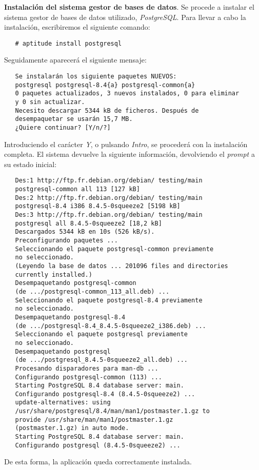 \item \textbf{Instalación del sistema gestor de bases de datos}.
   Se procede a instalar el sistema gestor de bases de datos utilizado,
   \textit{PostgreSQL}. Para llevar a cabo la instalación, escribiremos el
   siguiente comando:

   \begin{verbatim}
   # aptitude install postgresql
   \end{verbatim}

   Seguidamente aparecerá el siguiente mensaje:

   \begin{verbatim}
   Se instalarán los siguiente paquetes NUEVOS:
   postgresql postgresql-8.4{a} postgresql-common{a}
   0 paquetes actualizados, 3 nuevos instalados, 0 para eliminar
   y 0 sin actualizar.
   Necesito descargar 5344 kB de ficheros. Después de
   desempaquetar se usarán 15,7 MB.
   ¿Quiere continuar? [Y/n/?]
   \end{verbatim}

   Introduciendo el carácter \textit{Y}, o pulsando \textit{Intro}, se procederá
   con la instalación completa. El sistema devuelve la siguiente información,
   devolviendo el \textit{prompt} a su estado inicial:

   \begin{verbatim}
   Des:1 http://ftp.fr.debian.org/debian/ testing/main
   postgresql-common all 113 [127 kB]
   Des:2 http://ftp.fr.debian.org/debian/ testing/main
   postgresql-8.4 i386 8.4.5-0squeeze2 [5198 kB]
   Des:3 http://ftp.fr.debian.org/debian/ testing/main
   postgresql all 8.4.5-0squeeze2 [18,2 kB]
   Descargados 5344 kB en 10s (526 kB/s).
   Preconfigurando paquetes ...
   Seleccionando el paquete postgresql-common previamente
   no seleccionado.
   (Leyendo la base de datos ... 201096 files and directories
   currently installed.)
   Desempaquetando postgresql-common
   (de .../postgresql-common_113_all.deb) ...
   Seleccionando el paquete postgresql-8.4 previamente
   no seleccionado.
   Desempaquetando postgresql-8.4
   (de .../postgresql-8.4_8.4.5-0squeeze2_i386.deb) ...
   Seleccionando el paquete postgresql previamente
   no seleccionado.
   Desempaquetando postgresql
   (de .../postgresql_8.4.5-0squeeze2_all.deb) ...
   Procesando disparadores para man-db ...
   Configurando postgresql-common (113) ...
   Starting PostgreSQL 8.4 database server: main.
   Configurando postgresql-8.4 (8.4.5-0squeeze2) ...
   update-alternatives: using
   /usr/share/postgresql/8.4/man/man1/postmaster.1.gz to
   provide /usr/share/man/man1/postmaster.1.gz
   (postmaster.1.gz) in auto mode.
   Starting PostgreSQL 8.4 database server: main.
   Configurando postgresql (8.4.5-0squeeze2) ...
   \end{verbatim}

   De esta forma, la aplicación queda correctamente instalada.
